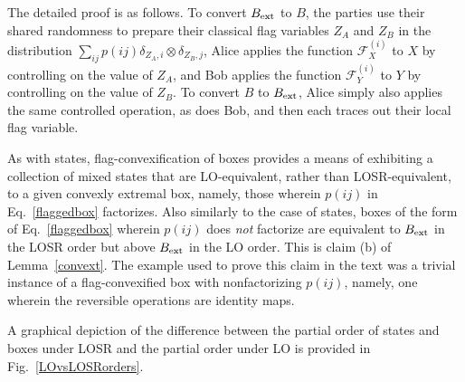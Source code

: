 \documentclass[12pt]{article}
\theoremstyle{plain}
\theoremstyle{definition}
\begin{document}
\begin{appendices}
The detailed proof 
 is as follows.   To convert $B_{\rm ext}$ to $B$, the parties use their shared randomness to prepare their classical flag variables $Z_A$ and $Z_B$ in the distribution ${\sum_{ij} p(ij) \delta_{Z_A,i} \otimes \delta_{Z_B,j}}$, Alice applies the function $\mathcal{F}^{(i)}_{X}$ to $X$ by controlling on the value of $Z_A$, and Bob applies the function $\mathcal{F}^{(i)}_{Y}$ to $Y$ by controlling on the value of $Z_B$. To convert $B$ to $B_{\rm ext}$, Alice simply also applies the same controlled operation, as does Bob, and then each traces out their local flag variable.

As with states, flag-convexification of boxes provides a means of exhibiting a collection of mixed states that are LO-equivalent, rather than LOSR-equivalent, to a given convexly extremal box, namely, those wherein $p(ij)$ in Eq.~\eqref{flaggedbox} factorizes.  Also similarly to the case of states, boxes of the form of Eq.~\eqref{flaggedbox} wherein $p(ij)$ does {\em not} factorize are equivalent to $B_{\rm ext}$ in the LOSR order but above $B_{\rm ext}$ in the LO order.  This is claim (b) of Lemma~\ref{convext}.  The example used to prove this claim in the text was a trivial instance of a flag-convexified box with nonfactorizing $p(ij)$, namely, one wherein the reversible operations are identity maps. 


A graphical depiction of the difference between the partial order of states and boxes under LOSR and the partial order under LO is provided in Fig.~\ref{LOvsLOSRorders}.
 

\end{appendices}
\end{document}
